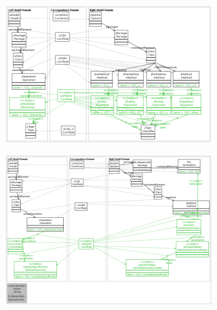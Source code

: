 \documentclass[tuberlin,cic,tc,english,noabntcite]{iiufrgs}
\begin{document}
\begin{figure}[h]
    \caption{}
    \begin{center}
        \includegraphics[width=40em]{uOParamenter2jMArgument}
    \end{center}
    \label{fig:uOParamenter2jMArgument}
\end{figure}
\begin{figure}[h]
    \caption{}
    \begin{center}
        \includegraphics[width=40em]{uOPPre2jMAPre}
    \end{center}
    \label{fig:uOPPre2jMAPre}
\end{figure}
\end{document}

